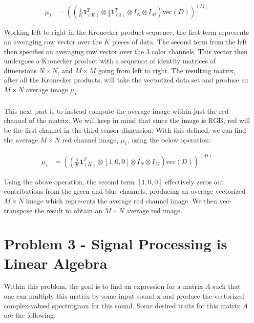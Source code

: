 \documentclass{article}[12pt]
\begin{document}
	\begin{align*}
	\mu_I &= \left(\left(\frac{1}{K}\boldsymbol{1}_{(K)}^{T} \otimes \frac{1}{3} \boldsymbol{1}_{(3)}^{T} \otimes I_N \otimes I_M\right) \text{vec}(D) \right)^{(M)}
	\end{align*}
	
	Working left to right in the Kronecker product sequence, the first term represents an averaging row vector over the $K$ pieces of data. The second term from the left then specifies an averaging row vector over the $3$ color channels. This vector then undergoes a Kronecker product with a sequence of identity matrices of dimensions $N \times N$, and $M \times M$ going from left to right. The resulting matrix, after all the Kronecker products, will take the vectorized data set and produce an $M \times N$ average image $\mu_I$.
	
	\subsubsection{}
	This next part is to instead compute the average image within just the red channel of the matrix. We will keep in mind that since the image is RGB, red will be the first channel in the third tensor dimension. With this defined, we can find the average $M \times N$ red channel image, $\mu_r$,  using the below operation:
	
	\begin{align*}
	\mu_r &= \left( \left(\frac{1}{K}\boldsymbol{1}_{(K)}^{T} \otimes [1,0,0] \otimes I_N \otimes I_M\right) \text{vec}(D) \right)^{(M)}
	\end{align*}

Using the above operation, the second term $[1, 0, 0]$ effectively zeros out contributions from the green and blue channels, producing an average vectorized $M \times N$ image which represents the average red channel image. We then vec-transpose the result to obtain an $M \times N$ average red image.

\newpage
\section{Problem 3 - Signal Processing is Linear Algebra}
Within this problem, the goal is to find an expression for a matrix $A$ such that one can multiply this matrix by some input sound $\boldsymbol{x}$ and produce the vectorized complex-valued spectrogram for this sound. Some desired traits for this matrix $A$ are the following:
\end{document}
